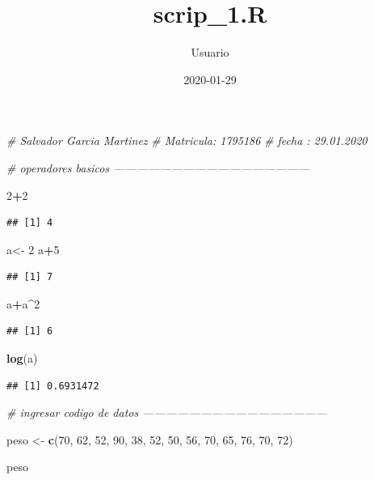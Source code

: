 \documentclass[
]{article}
\title{scrip\_1.R}
\author{Usuario}
\date{2020-01-29}
\newenvironment{Shaded}{\begin{snugshade}}{\end{snugshade}}
\newcommand{\CommentTok}[1]{\textcolor[rgb]{0.56,0.35,0.01}{\textit{#1}}}
\newcommand{\DecValTok}[1]{\textcolor[rgb]{0.00,0.00,0.81}{#1}}
\newcommand{\KeywordTok}[1]{\textcolor[rgb]{0.13,0.29,0.53}{\textbf{#1}}}
\newcommand{\NormalTok}[1]{#1}
\newcommand{\OperatorTok}[1]{\textcolor[rgb]{0.81,0.36,0.00}{\textbf{#1}}}
\newcommand{\StringTok}[1]{\textcolor[rgb]{0.31,0.60,0.02}{#1}}
\begin{document}
\maketitle

\begin{Shaded}
\begin{Highlighting}[]
\CommentTok{# Salvador Garcia Martinez }
\CommentTok{# Matricula: 1795186}
\CommentTok{# fecha : 29.01.2020 }

 \CommentTok{# operadores basicos  ---------------------------------------------------}


 \DecValTok{2}\OperatorTok{+}\DecValTok{2}
\end{Highlighting}
\end{Shaded}

\begin{verbatim}
## [1] 4
\end{verbatim}

\begin{Shaded}
\begin{Highlighting}[]
\NormalTok{ a<-}\StringTok{ }\DecValTok{2}
\NormalTok{a}\OperatorTok{+}\DecValTok{5} 
\end{Highlighting}
\end{Shaded}

\begin{verbatim}
## [1] 7
\end{verbatim}

\begin{Shaded}
\begin{Highlighting}[]
\NormalTok{a}\OperatorTok{+}\NormalTok{a}\OperatorTok{^}\DecValTok{2}
\end{Highlighting}
\end{Shaded}

\begin{verbatim}
## [1] 6
\end{verbatim}

\begin{Shaded}
\begin{Highlighting}[]
\KeywordTok{log}\NormalTok{(a)}
\end{Highlighting}
\end{Shaded}

\begin{verbatim}
## [1] 0.6931472
\end{verbatim}

\begin{Shaded}
\begin{Highlighting}[]
\CommentTok{# ingresar codigo de datos ------------------------------------------------}

\NormalTok{peso <-}\StringTok{ }\KeywordTok{c}\NormalTok{(}\DecValTok{70}\NormalTok{, }\DecValTok{62}\NormalTok{, }\DecValTok{52}\NormalTok{, }\DecValTok{90}\NormalTok{, }\DecValTok{38}\NormalTok{, }\DecValTok{52}\NormalTok{, }\DecValTok{50}\NormalTok{, }\DecValTok{56}\NormalTok{, }\DecValTok{70}\NormalTok{, }\DecValTok{65}\NormalTok{, }\DecValTok{76}\NormalTok{, }\DecValTok{70}\NormalTok{, }\DecValTok{72}\NormalTok{)}

\NormalTok{peso}
\end{Highlighting}
\end{Shaded}
\end{document}

